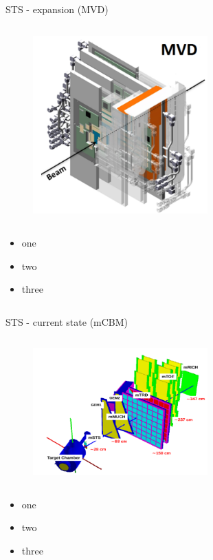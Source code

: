 \begin{columnframe}{STS - expansion (MVD)}
    \begin{column}{0.5\textwidth}
        \begin{figure}
            \centering
            \includegraphics[width=0.6\textwidth, frame]{images/mvd_render.png}
        \end{figure}
    \end{column}
    \begin{column}{0.5\textwidth}
        \begin{itemize}
            \item one
            \item two
            \item three
        \end{itemize}
    \end{column}
\end{columnframe}

\begin{columnframe}{STS - current state (mCBM)}
    \begin{column}{0.5\textwidth}
        \begin{figure}
            \centering
            \includegraphics[width=0.6\textwidth, frame]{images/mCBM_render.png}
        \end{figure}
    \end{column}
    \begin{column}{0.5\textwidth}
        \begin{itemize}
            \item one
            \item two
            \item three
        \end{itemize}
    \end{column}
\end{columnframe}


